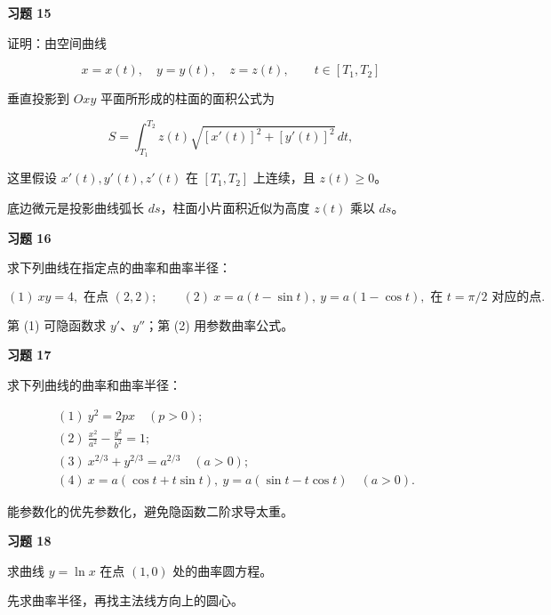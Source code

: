 \begin{exercisebox}
\textbf{习题 15 }

证明：由空间曲线

\[
      x=x(t),\quad y=y(t),\quad z=z(t),\qquad t\in[T_1,T_2]
      \]

垂直投影到 \(Oxy\) 平面所形成的柱面的面积公式为

\[
      S=\int_{T_1}^{T_2}z(t)\sqrt{[x'(t)]^2+[y'(t)]^2}\,dt,
      \]

这里假设 \(x'(t),y'(t),z'(t)\) 在 \([T_1,T_2]\) 上连续，且 \(z(t)\ge0\)。

\begin{hintbox}
底边微元是投影曲线弧长 \(ds\)，柱面小片面积近似为高度 \(z(t)\) 乘以 \(ds\)。
\end{hintbox}
\end{exercisebox}

\begin{exercisebox}
\textbf{习题 16 }

求下列曲线在指定点的曲率和曲率半径：

\[
      (1)\ xy=4,\text{ 在点 }(2,2);
      \qquad
      (2)\ x=a(t-\sin t),\ y=a(1-\cos t),\text{ 在 }t=\pi/2\text{ 对应的点}.
      \]

\begin{hintbox}
第 (1) 可隐函数求 \(y'\)、\(y''\)；第 (2) 用参数曲率公式。
\end{hintbox}
\end{exercisebox}

\begin{exercisebox}
\textbf{习题 17 }

求下列曲线的曲率和曲率半径：

\[
      \begin{aligned}
      &(1)\ y^2=2px\quad(p>0);\\
      &(2)\ \frac{x^2}{a^2}-\frac{y^2}{b^2}=1;\\
      &(3)\ x^{2/3}+y^{2/3}=a^{2/3}\quad(a>0);\\
      &(4)\ x=a(\cos t+t\sin t),\ y=a(\sin t-t\cos t)\quad(a>0).
      \end{aligned}
      \]

\begin{hintbox}
能参数化的优先参数化，避免隐函数二阶求导太重。
\end{hintbox}
\end{exercisebox}

\begin{exercisebox}
\textbf{习题 18 }

求曲线 \(y=\ln x\) 在点 \((1,0)\) 处的曲率圆方程。

\begin{hintbox}
先求曲率半径，再找主法线方向上的圆心。
\end{hintbox}
\end{exercisebox}

